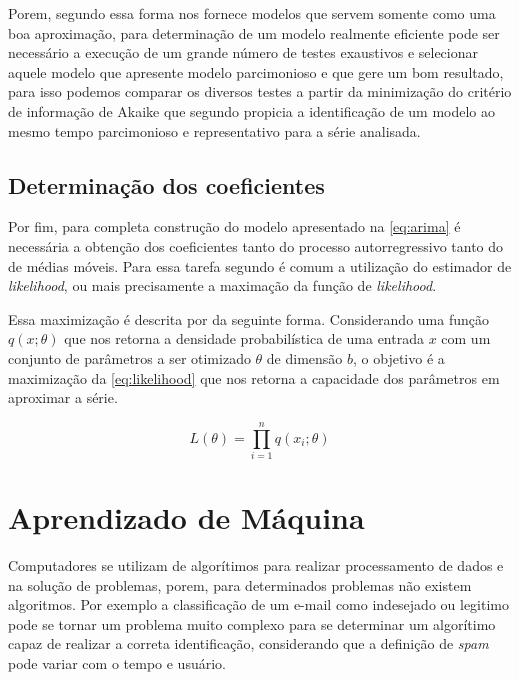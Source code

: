 \documentclass[
    12pt,
    oneside,
    a4paper,
    english,
    brazil
]{abntex2}
\begin{document}
Porem, segundo   essa  forma nos  fornece modelos  que servem
somente  como uma  boa aproximação,  para determinação  de um  modelo realmente
eficiente  pode  ser necessário  a  execução  de  um  grande número  de  testes
exaustivos e selecionar  aquele modelo que apresente modelo  parcimonioso e que
gere  um  bom resultado,  para  isso  podemos  comparar  os diversos  testes  a
partir  da  minimização  do  critério  de  informação  de  Akaike  que  segundo
  propicia  a identificação  de  um  modelo ao  mesmo  tempo
parcimonioso e representativo para a série analisada.

\subsection{Determinação dos coeficientes}

Por fim, para completa construção do modelo apresentado na \autoref{eq:arima} é
necessária  a  obtenção  dos  coeficientes tanto  do  processo  autorregressivo
tanto  do de  médias móveis.  Para essa  tarefa segundo  é
comum a utilização do estimador de \textit{likelihood}, ou mais precisamente a
maximação da função de \textit{likelihood}.

Essa  maximização   é  descrita   por     da  seguinte
forma.  Considerando  uma função  $q(x;\theta)$  que  nos retorna  a  densidade
probabilística de uma entrada $x$ com um conjunto de parâmetros a ser otimizado
$\theta$ de dimensão $b$, o objetivo é a maximização da \autoref{eq:likelihood}
que nos retorna a capacidade dos parâmetros em aproximar a série.

\begin{equation}\label{eq:likelihood}
    L(\theta) = \prod_{i=1}^{n}{q(x_i;\theta)}
\end{equation}

\section{Aprendizado de Máquina}

Computadores se utilizam de algorítimos  para realizar processamento de dados e
na  solução  de  problemas,  porem, para  determinados  problemas  não  existem
algoritmos.  Por  exemplo a  classificação  de  um  e-mail como  indesejado  ou
legitimo  pode se  tornar  um problema  muito complexo  para  se determinar  um
algorítimo  capaz  de realizar  a  correta  identificação, considerando  que  a
definição de \textit{spam} pode variar com o tempo e usuário.
\end{document}
